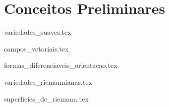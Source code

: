 \chapter{Conceitos Preliminares}

{variedades_suaves.tex}

{campos_vetoriais.tex}
	
{formas_diferenciaveis_orientacao.tex}	



{variedades_riemannianas.tex}

{superficies_de_riemann.tex}